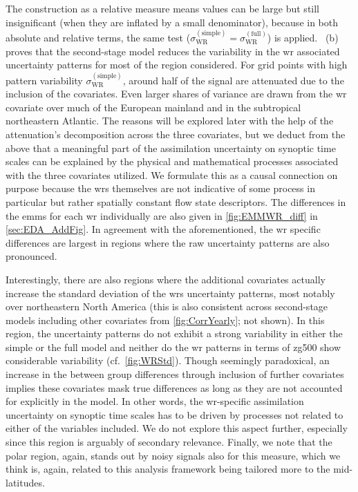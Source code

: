 The construction as a relative measure means values can be large but still insignificant (when they are inflated by a small denominator), because in both absolute and relative terms, the same test ($\sigma^{(\mathrm{simple})}_{\mathrm{WR}} = \sigma^{(\mathrm{full})}_{\mathrm{WR}}$) is applied. ~(b) proves that the second-stage model reduces the variability in the \gls{wr} associated uncertainty patterns for most of the region considered. For grid points with high pattern variability $\sigma_{\mathrm{WR}}^{\mathrm{(simple)}}$, around half of the signal are attenuated due to the inclusion of the covariates. Even larger shares of variance are drawn from the \gls{wr} covariate over much of the European mainland and in the subtropical northeastern Atlantic. The reasons will be explored later with the help of the attenuation's decomposition across the three covariates, but we deduct from the above that a meaningful part of the assimilation uncertainty on synoptic time scales can be explained by the physical and mathematical processes associated with the three covariates utilized. We formulate this as a causal connection on purpose because the \glspl{wr} themselves are not indicative of some process in particular but rather spatially constant flow state descriptors. The differences in the \glspl{emm} for each \gls{wr} individually are also given in \cref{fig:EMMWR_diff} in \cref{sec:EDA_AddFig}. In agreement with the aforementioned, the \gls{wr} specific differences are largest in regions where the raw uncertainty patterns are also pronounced.

Interestingly, there are also regions where the additional covariates actually increase the standard deviation of the \glspl{wr} uncertainty patterns, most notably over northeastern North America (this is also consistent across second-stage models including other covariates from \cref{fig:CorrYearly}; not shown). In this region, the uncertainty patterns do not exhibit a strong variability in either the simple or the full model and neither do the \gls{wr} patterns in terms of \gls{zg500} show considerable variability (cf.~\cref{fig:WRStd}). Though seemingly paradoxical, an increase in the between group differences through inclusion of further covariates implies these covariates mask true differences as long as they are not accounted for explicitly in the model. In other words, the \gls{wr}-specific assimilation uncertainty on synoptic time scales has to be driven by processes not related to either of the variables included. We do not explore this aspect further, especially since this region is arguably of secondary relevance. Finally, we note that the polar region, again, stands out by noisy signals also for this measure, which we think is, again, related to this analysis framework being tailored more to the mid-latitudes.

